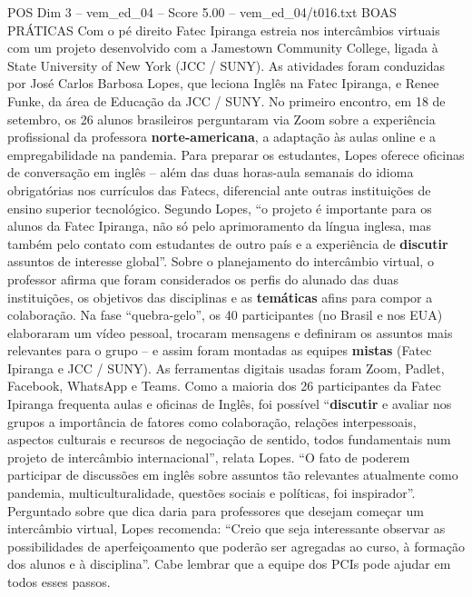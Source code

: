 \begin{textsample}{POS Dim 3 – vem\_ed\_04 – Score 5.00 – vem\_ed\_04/t016.txt}  \label{ex:f3_pos_146}
BOAS PRÁTICAS Com o pé direito Fatec Ipiranga estreia nos intercâmbios virtuais com um projeto desenvolvido com a Jamestown Community College, ligada à State University of New York (JCC / SUNY).
As atividades foram conduzidas por José Carlos Barbosa Lopes, que leciona Inglês na Fatec Ipiranga, e Renee Funke, da área de Educação da JCC / SUNY.
No primeiro encontro, em 18 de setembro, os 26 alunos brasileiros perguntaram via Zoom sobre a experiência profissional da professora \textbf{norte-americana}, a adaptação às aulas online e a empregabilidade na pandemia.
Para preparar os estudantes, Lopes oferece oficinas de conversação em inglês – além das duas horas-aula semanais do idioma obrigatórias nos currículos das Fatecs, diferencial ante outras instituições de ensino superior tecnológico.
Segundo Lopes, “o projeto é importante para os alunos da Fatec Ipiranga, não só pelo aprimoramento da língua inglesa, mas também pelo contato com estudantes de outro país e a experiência de \textbf{discutir} assuntos de interesse global”.
Sobre o planejamento do intercâmbio virtual, o professor afirma que foram considerados os perfis do alunado das duas instituições, os objetivos das disciplinas e as \textbf{temáticas} afins para compor a colaboração.
Na fase “quebra-gelo”, os 40 participantes (no Brasil e nos EUA) elaboraram um vídeo pessoal, trocaram mensagens e definiram os assuntos mais relevantes para o grupo – e assim foram montadas as equipes \textbf{mistas} (Fatec Ipiranga e JCC / SUNY).
As ferramentas digitais usadas foram Zoom, Padlet, Facebook, WhatsApp e Teams.
Como a maioria dos 26 participantes da Fatec Ipiranga frequenta aulas e oficinas de Inglês, foi possível “\textbf{discutir} e avaliar nos grupos a importância de fatores como colaboração, relações interpessoais, aspectos culturais e recursos de negociação de sentido, todos fundamentais num projeto de intercâmbio internacional”, relata Lopes. “O fato de poderem participar de discussões em inglês sobre assuntos tão relevantes atualmente como pandemia, multiculturalidade, questões sociais e políticas, foi inspirador”.
Perguntado sobre que dica daria para professores que desejam começar um intercâmbio virtual, Lopes recomenda: “Creio que seja interessante observar as possibilidades de aperfeiçoamento que poderão ser agregadas ao curso, à formação dos alunos e à disciplina”.
Cabe lembrar que a equipe dos PCIs pode ajudar em todos esses passos.

\end{textsample}
